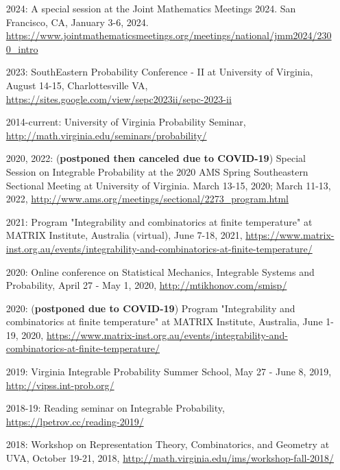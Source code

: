 \documentclass[letterpaper,11pt]{article}
\begin{document}
\begin{itemize}
	\item [2024:] A special session at the Joint Mathematics Meetings 2024. San Francisco, CA, January 3-6, 2024. \url{https://www.jointmathematicsmeetings.org/meetings/national/jmm2024/2300_intro}

	\item [2023:] SouthEastern Probability Conference - II at University of Virginia, August 14-15, Charlottesville VA, \url{https://sites.google.com/view/sepc2023ii/sepc-2023-ii}
	
	\item
	[2014-current:] University of Virginia Probability Seminar,
  	\url{http://math.virginia.edu/seminars/probability/}

	\item [2020, 2022:]
	(\textbf{postponed then canceled due to COVID-19})
		Special Session on Integrable Probability
		at the 2020 AMS Spring Southeastern Sectional Meeting at 
		University of Virginia.
		March 13-15, 2020; March 11-13, 2022,
		\url{http://www.ams.org/meetings/sectional/2273_program.html}
	
	\item [2021:]
		Program "Integrability and combinatorics at finite temperature"
		at MATRIX Institute, Australia
		(virtual),
		June 7-18, 2021,
		\url{https://www.matrix-inst.org.au/events/integrability-and-combinatorics-at-finite-temperature/}
	\item [2020:]
	Online conference on Statistical Mechanics, Integrable Systems and Probability,
	April 27 - May 1, 2020,
	\url{http://mtikhonov.com/smisp/}
	\item [2020:]
	(\textbf{postponed due to COVID-19})
	Program "Integrability and combinatorics at finite temperature"
	at MATRIX Institute,
	Australia,
	June 1-19, 2020,
	\url{https://www.matrix-inst.org.au/events/integrability-and-combinatorics-at-finite-temperature/}
	
	\item [2019:]
		Virginia Integrable Probability Summer School,
		May 27 - June 8, 2019,
		\url{http://vipss.int-prob.org/}

	\item[2018-19:]
		Reading seminar on Integrable Probability,
	      \url{https://lpetrov.cc/reading-2019/}
		

	\item [2018:]
		Workshop on Representation Theory, Combinatorics, and Geometry
		at UVA,
		October 19-21, 2018,
		\url{http://math.virginia.edu/ims/workshop-fall-2018/}


\end{itemize}
\end{document}
